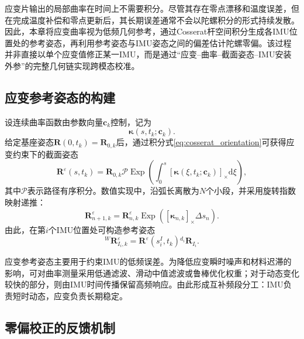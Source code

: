 应变片输出的局部曲率在时间上不需要积分。尽管其存在零点漂移和温度误差，但在完成温度补偿和零点更新后，其长期误差通常不会以陀螺积分的形式持续发散。因此，本章将应变曲率视为低频几何参考，通过Cosserat杆空间积分生成各IMU位置处的参考姿态，再利用参考姿态与IMU姿态之间的偏差估计陀螺零偏。该过程并非直接以单个应变值修正某一IMU，而是通过“应变--曲率--截面姿态--IMU安装外参”的完整几何链实现跨模态校准。

\subsection{应变参考姿态的构建}

设连续曲率函数由参数向量$\bm c_k$控制，记为
\begin{equation}
    \bm\kappa(s,t_k;\bm c_k).
\end{equation}
给定基座姿态$\bm R(0,t_k)=\bm R_{0,k}$后，通过积分式\eqref{eq:cosserat_orientation}可获得应变约束下的截面姿态
\begin{equation}
    \bm R^{\varepsilon}(s,t_k)
    =\bm R_{0,k}
    \mathcal P\operatorname{Exp}
    \left(
    \int_{0}^{s}
    [\bm\kappa(\xi,t_k;\bm c_k)]_{\times}
    \mathrm d\xi
    \right),
    \label{eq:strain_reference_orientation}
\end{equation}
其中$\mathcal P$表示路径有序积分。数值实现中，沿弧长离散为$N$个小段，并采用旋转指数映射递推：
\begin{equation}
    \bm R_{n+1,k}^{\varepsilon}
    =\bm R_{n,k}^{\varepsilon}
    \operatorname{Exp}\left(
    [\bm\kappa_{n,k}]_{\times}\Delta s_n
    \right).
    \label{eq:spatial_rotation_discretization}
\end{equation}
由此，在第$i$个IMU位置处可构造参考姿态
\begin{equation}
    {}^{W}\bm R_{I_i,k}^{\varepsilon}
    =\bm R^{\varepsilon}(s_i^I,t_k){}^{d_i}\bm R_{I_i}.
\end{equation}

应变参考姿态主要用于约束IMU的低频误差。为降低应变瞬时噪声和材料迟滞的影响，可对曲率测量采用低通滤波、滑动中值滤波或鲁棒优化权重；对于动态变化较快的部分，则由IMU时间传播保留高频响应。由此形成互补频段分工：IMU负责短时动态，应变负责长期稳定。

\subsection{零偏校正的反馈机制}

